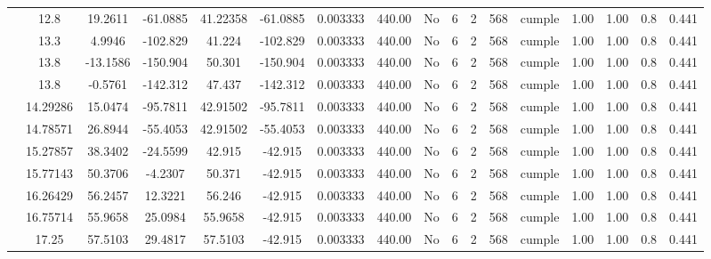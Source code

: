 \begin{table}[H]
{\begin{tabular}{|c|c|c|c|c|c|c|c|c|c|c|c|c|c|c|c|c|}
\cline{2-17}    & 12.8 & 19.2611 & -61.0885 & 41.22358 & -61.0885 & 0.003333 & 440.00 & No  & 6   & 2   & 568 & \cellcolor[rgb]{ .776,  .937,  .808}cumple & 1.00 & 1.00 & 0.8 & 0.441 \bigstrut\\
\cline{2-17}    & 13.3 & 4.9946 & -102.829 & 41.224 & -102.829 & 0.003333 & 440.00 & No  & 6   & 2   & 568 & \cellcolor[rgb]{ .776,  .937,  .808}cumple & 1.00 & 1.00 & 0.8 & 0.441 \bigstrut\\
\cline{2-17}    & \cellcolor[rgb]{ .851,  .882,  .949}13.8 & -13.1586 & -150.904 & 50.301 & -150.904 & 0.003333 & 440.00 & No  & 6   & 2   & 568 & \cellcolor[rgb]{ .776,  .937,  .808}cumple & 1.00 & 1.00 & 0.8 & 0.441 \bigstrut\\
\cline{2-17}    & \cellcolor[rgb]{ .851,  .882,  .949}13.8 & -0.5761 & -142.312 & 47.437 & -142.312 & 0.003333 & 440.00 & No  & 6   & 2   & 568 & \cellcolor[rgb]{ .776,  .937,  .808}cumple & 1.00 & 1.00 & 0.8 & 0.441 \bigstrut\\
\cline{2-17}    & 14.29286 & 15.0474 & -95.7811 & 42.91502 & -95.7811 & 0.003333 & 440.00 & No  & 6   & 2   & 568 & \cellcolor[rgb]{ .776,  .937,  .808}cumple & 1.00 & 1.00 & 0.8 & 0.441 \bigstrut\\
\cline{2-17}    & 14.78571 & 26.8944 & -55.4053 & 42.91502 & -55.4053 & 0.003333 & 440.00 & No  & 6   & 2   & 568 & \cellcolor[rgb]{ .776,  .937,  .808}cumple & 1.00 & 1.00 & 0.8 & 0.441 \bigstrut\\
\cline{2-17}    & 15.27857 & 38.3402 & -24.5599 & 42.915 & -42.915 & 0.003333 & 440.00 & No  & 6   & 2   & 568 & \cellcolor[rgb]{ .776,  .937,  .808}cumple & 1.00 & 1.00 & 0.8 & 0.441 \bigstrut\\
\cline{2-17}    & 15.77143 & 50.3706 & -4.2307 & 50.371 & -42.915 & 0.003333 & 440.00 & No  & 6   & 2   & 568 & \cellcolor[rgb]{ .776,  .937,  .808}cumple & 1.00 & 1.00 & 0.8 & 0.441 \bigstrut\\
\cline{2-17}    & 16.26429 & 56.2457 & 12.3221 & 56.246 & -42.915 & 0.003333 & 440.00 & No  & 6   & 2   & 568 & \cellcolor[rgb]{ .776,  .937,  .808}cumple & 1.00 & 1.00 & 0.8 & 0.441 \bigstrut\\
\cline{2-17}    & 16.75714 & 55.9658 & 25.0984 & 55.9658 & -42.915 & 0.003333 & 440.00 & No  & 6   & 2   & 568 & \cellcolor[rgb]{ .776,  .937,  .808}cumple & 1.00 & 1.00 & 0.8 & 0.441 \bigstrut\\
\cline{2-17}    & 17.25 & 57.5103 & 29.4817 & 57.5103 & -42.915 & 0.003333 & 440.00 & No  & 6   & 2   & 568 & \cellcolor[rgb]{ .776,  .937,  .808}cumple & 1.00 & 1.00 & 0.8 & 0.441 \bigstrut\\

\end{tabular}}
\end{table}
